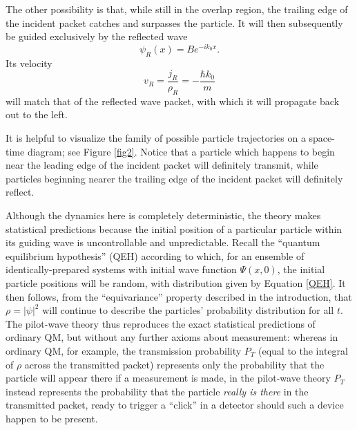 \documentclass[aps,prc,twocolumn,letterpaper,floatfix]{revtex4}
\begin{document}
The other possibility is that, while still in the overlap region, the
trailing edge of the incident packet catches and surpasses the
particle.  It will then subsequently be guided exclusively by the
reflected wave
\begin{equation}
\psi_R(x) = B e^{-i k_0 x}.
\end{equation}
Its velocity
\begin{equation}
v_R = \frac{j_R}{\rho_R} = - \frac{\hbar k_0}{m}
\end{equation}
will match that of the reflected wave packet, with which it will
propagate back out to the left.  


It is helpful to visualize the family of possible particle
trajectories on a space-time diagram; see Figure \ref{fig2}.  Notice
that a particle which happens to begin near the leading edge of the
incident packet will definitely transmit, while particles beginning
nearer the trailing edge of the incident packet will definitely
reflect.  

Although the dynamics here is completely deterministic, the
theory makes statistical predictions because the initial position of a
particular particle within its guiding wave is uncontrollable and
unpredictable.  Recall the ``quantum equilibrium hypothesis'' (QEH)
according to which, for an ensemble of identically-prepared systems
with initial wave function $\Psi(x,0)$, the initial particle positions
will be random, with distribution given by Equation
\eqref{QEH}.  It then follows, from the ``equivariance'' property
described in the introduction, that $\rho = |\psi|^2$ will continue to
describe the particles' probability distribution for all $t$.  The
pilot-wave theory thus reproduces the exact statistical predictions of
ordinary QM, but without any further axioms about measurement:
whereas in ordinary QM, for example, the transmission probability $P_T$
(equal to the integral of $\rho$ across the transmitted packet)
represents only the probability that the particle will appear there if
a measurement is made, in the pilot-wave theory $P_T$ instead represents
the probability that the particle \emph{really is there} in the
transmitted packet, ready to trigger a ``click'' in a detector should
such a device happen to be present.  
\end{document}
